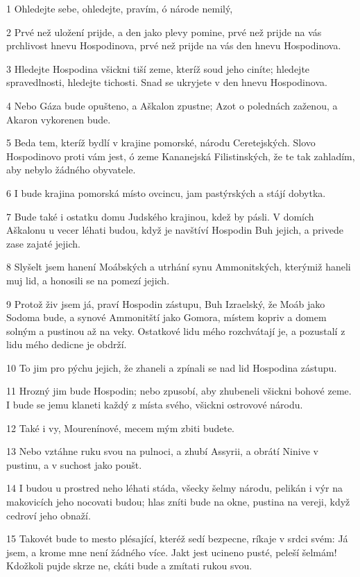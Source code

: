 \par 1 Ohledejte sebe, ohledejte, pravím, ó národe nemilý,
\par 2 Prvé než uložení prijde, a den jako plevy pomine, prvé než prijde na vás prchlivost hnevu Hospodinova, prvé než prijde na vás den hnevu Hospodinova.
\par 3 Hledejte Hospodina všickni tiší zeme, kteríž soud jeho ciníte; hledejte spravedlnosti, hledejte tichosti. Snad se ukryjete v den hnevu Hospodinova.
\par 4 Nebo Gáza bude opušteno, a Aškalon zpustne; Azot o polednách zaženou, a Akaron vykorenen bude.
\par 5 Beda tem, kteríž bydlí v krajine pomorské, národu Ceretejských. Slovo Hospodinovo proti vám jest, ó zeme Kananejská Filistinských, že te tak zahladím, aby nebylo žádného obyvatele.
\par 6 I bude krajina pomorská místo ovcincu, jam pastýrských a stájí dobytka.
\par 7 Bude také i ostatku domu Judského krajinou, kdež by pásli. V domích Aškalonu u vecer léhati budou, když je navštíví Hospodin Buh jejich, a privede zase zajaté jejich.
\par 8 Slyšelt jsem hanení Moábských a utrhání synu Ammonitských, kterýmiž haneli muj lid, a honosili se na pomezí jejich.
\par 9 Protož živ jsem já, praví Hospodin zástupu, Buh Izraelský, že Moáb jako Sodoma bude, a synové Ammonitští jako Gomora, místem kopriv a domem solným a pustinou až na veky. Ostatkové lidu mého rozchvátají je, a pozustalí z lidu mého dedicne je obdrží.
\par 10 To jim pro pýchu jejich, že zhaneli a zpínali se nad lid Hospodina zástupu.
\par 11 Hrozný jim bude Hospodin; nebo zpusobí, aby zhubeneli všickni bohové zeme. I bude se jemu klaneti každý z místa svého, všickni ostrovové národu.
\par 12 Také i vy, Mourenínové, mecem mým zbiti budete.
\par 13 Nebo vztáhne ruku svou na pulnoci, a zhubí Assyrii, a obrátí Ninive v pustinu, a v suchost jako poušt.
\par 14 I budou u prostred neho léhati stáda, všecky šelmy národu, pelikán i výr na makovicích jeho nocovati budou; hlas zníti bude na okne, pustina na vereji, když cedroví jeho obnaží.
\par 15 Takovét bude to mesto plésající, kteréž sedí bezpecne, ríkaje v srdci svém: Já jsem, a krome mne není žádného více. Jakt jest ucineno pusté, peleší šelmám! Kdožkoli pujde skrze ne, ckáti bude a zmítati rukou svou.


